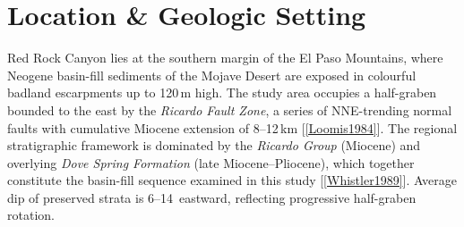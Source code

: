 \section{Location \& Geologic Setting}

Red Rock Canyon lies at the southern margin of the El Paso Mountains, where
Neogene basin-fill sediments of the Mojave Desert are exposed in colourful badland
escarpments up to 120\,m high.
The study area occupies a half-graben bounded to the east by the
\textit{Ricardo Fault Zone}, a series of NNE-trending normal faults with
cumulative Miocene extension of 8--12\,km [\ref{Loomis1984}].
The regional stratigraphic framework is dominated by the
\textit{Ricardo Group} (Miocene) and overlying \textit{Dove Spring Formation}
(late Miocene--Pliocene), which together constitute the basin-fill sequence examined in
this study [\ref{Whistler1989}].
Average dip of preserved strata is 6--14\textdegree\ eastward, reflecting progressive
half-graben rotation.

